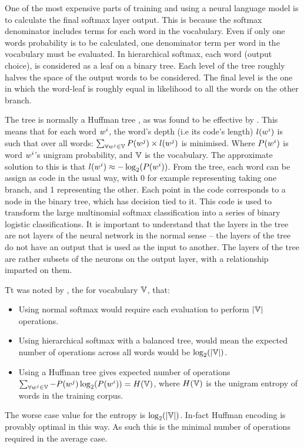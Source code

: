 \documentclass[parskip]{komatufte}
\begin{document}
One of the most expensive parts of training and using a neural language model is  to calculate the final softmax layer output.
This is because the softmax denominator includes terms for each word in the vocabulary.
Even if only one words probability is to be calculated, one denominator term per word in the vocabulary must be evaluated.
In hierarchical softmax, each word (output choice), is considered as a leaf on a binary tree.
Each level of the tree roughly halves the space of the output words to be considered.
The final level is the one in which the word-leaf is roughly equal in likelihood to all the words on the other branch.

The tree is normally a Huffman tree , as was found to be effective by \textcite{mikolov2013efficient}.
This means that for each word $\n w_i$, the word's depth (i.e its code's length) $l(\n w_i)$ is such that over all words:
 $\sum_{\forall \n w_j \in \set{V}} P(\n w_j)\times l(\n w_j)$ is minimised.
Where $P(\n w_i)$ is word $\n w_i$'s unigram probability, and $\mathbb{V}$ is the vocabulary.
The approximate solution to this is that $l(\n w_i) \approx -\log_2(P(\n w_i))$.
From the tree, each word can be assign as code in the usual way, with 0 for example representing taking one branch, and 1 representing the other.
Each point in the code corresponds to a node in the binary tree, which has decision tied to it.
This code is used to transform the large  multinomial softmax classification into a series of binary logistic classifications.
It is important to understand that the layers in the tree are not layers of the neural network in the normal sense -- the layers of the tree do not have an output that is used as the input to another.
The layers of the tree are rather subsets of the neurons on the output layer, with a relationship imparted on them.

Tt was noted by \textcite{mikolov2013efficient}, the for vocabulary $\mathbb{V}$, that:
\begin{itemize}
	\item Using normal softmax would require each evaluation to perform $|\mathbb{V}|$ operations.
	\item Using hierarchical softmax with a balanced tree, would mean the expected number of operations across all words would be $\log_2(|\mathbb{V}|)$.
	\item Using a Huffman tree gives expected number of operations $\sum_{\forall \n w_j \in \set{V}} -P(\n w_j)\log_2(P(\n w_i)) = H(\set{V})$, where $H(\mathbb{V})$ is the unigram entropy of words in the training corpus.
\end{itemize}
The worse case value for the entropy is $\log_2(|\mathbb{V}|)$.
In-fact Huffman encoding is provably optimal in this way.
As such this is the minimal number of operations required in the average case.
\end{document}

